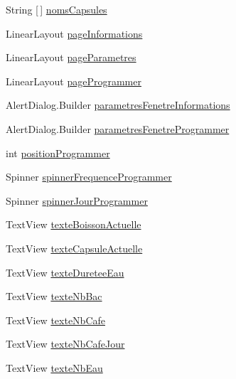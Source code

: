 \begin{DoxyCompactItemize}
\item 
String \mbox{[}$\,$\mbox{]} \hyperlink{classcom_1_1example_1_1ekawa_1_1_ihm_a9d61b7bfd998d449bb405dcf5e6e4e89}{noms\+Capsules}
\item 
Linear\+Layout \hyperlink{classcom_1_1example_1_1ekawa_1_1_ihm_a554ab8cbe600e837516ec78e62312fea}{page\+Informations}
\item 
Linear\+Layout \hyperlink{classcom_1_1example_1_1ekawa_1_1_ihm_a12537211f4d695c3dc62713da00ffa35}{page\+Parametres}
\item 
Linear\+Layout \hyperlink{classcom_1_1example_1_1ekawa_1_1_ihm_a9a3747e82c5917a681a8d8a726cd5fa8}{page\+Programmer}
\item 
Alert\+Dialog.\+Builder \hyperlink{classcom_1_1example_1_1ekawa_1_1_ihm_a610b25d0bf8b26fbf1ed24345acef189}{parametres\+Fenetre\+Informations}
\item 
Alert\+Dialog.\+Builder \hyperlink{classcom_1_1example_1_1ekawa_1_1_ihm_a6eb2afb2fe8da7f3a749089c84934145}{parametres\+Fenetre\+Programmer}
\item 
int \hyperlink{classcom_1_1example_1_1ekawa_1_1_ihm_ada29cde0c67d8614d47b27ed04c337e9}{position\+Programmer}
\item 
Spinner \hyperlink{classcom_1_1example_1_1ekawa_1_1_ihm_ab266576a3855dbd6e36e346ddb27247a}{spinner\+Frequence\+Programmer}
\item 
Spinner \hyperlink{classcom_1_1example_1_1ekawa_1_1_ihm_a49e6261929f259b2fcc81bf13d21ad7f}{spinner\+Jour\+Programmer}
\item 
Text\+View \hyperlink{classcom_1_1example_1_1ekawa_1_1_ihm_a6655fee013d48228f2c7981f1cd8f74e}{texte\+Boisson\+Actuelle}
\item 
Text\+View \hyperlink{classcom_1_1example_1_1ekawa_1_1_ihm_a3a9c8a185607e09fed0df62e46925786}{texte\+Capsule\+Actuelle}
\item 
Text\+View \hyperlink{classcom_1_1example_1_1ekawa_1_1_ihm_ac19dc1f761f988fcd51bbdb6f67a4009}{texte\+Duretee\+Eau}
\item 
Text\+View \hyperlink{classcom_1_1example_1_1ekawa_1_1_ihm_a96074c1992a3a44734b3c82e5cdf073b}{texte\+Nb\+Bac}
\item 
Text\+View \hyperlink{classcom_1_1example_1_1ekawa_1_1_ihm_a30418331964030ba9c2cb5f4e7b34b2c}{texte\+Nb\+Cafe}
\item 
Text\+View \hyperlink{classcom_1_1example_1_1ekawa_1_1_ihm_a06f0f159882f0c5c3e3cca7f698489c9}{texte\+Nb\+Cafe\+Jour}
\item 
Text\+View \hyperlink{classcom_1_1example_1_1ekawa_1_1_ihm_a6abf08d241bab230727c22069aa7913c}{texte\+Nb\+Eau}

\end{DoxyCompactItemize}
